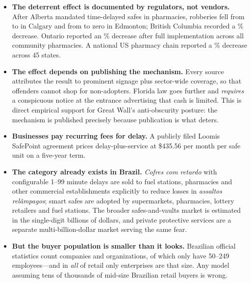 \begin{itemize}[nosep]
  \item \textbf{The deterrent effect is documented by regulators, not vendors.} After
    Alberta mandated time-delayed safes in pharmacies, robberies fell from
     to  in Calgary and from  to zero in Edmonton;
    British Columbia recorded a \% decrease\cite{ocp2024safes}. Ontario
    reported an \% decrease after full implementation across all community
    pharmacies\cite{oacp2024safes}. A national US pharmacy chain reported a
    \% decrease across 45 states\cite{cvssafes2015}.
  \item \textbf{The effect depends on publishing the mechanism.} Every source
    attributes the result to prominent signage plus sector-wide coverage, so that
    offenders cannot shop for non-adopters\cite{ocp2024safes,cvssafes2015}. Florida
    law goes further and \emph{requires} a conspicuous notice at the entrance
    advertising that cash is limited\cite{flsenate812173}. This is direct empirical
    support for Great Wall's anti-obscurity posture: the mechanism is published
    precisely because publication is what deters.
  \item \textbf{Businesses pay recurring fees for delay.} A publicly filed Loomis
    SafePoint agreement prices delay-plus-service at
    \$\num[round-precision=2]{435.56} per month per safe unit on a five-year
    term\cite{loomis2016safepoint}.
  \item \textbf{The category already exists in Brazil.} \textit{Cofres com retardo}
    with configurable 1--99 minute delays are sold to fuel stations, pharmacies and
    other commercial establishments explicitly to reduce losses in
    \textit{assaltos rel\^{a}mpagos}\cite{importec2024retardo}; smart safes are adopted
    by supermarkets, pharmacies, lottery retailers and fuel
    stations\cite{prosegur2024cofres}. The broader safes-and-vaults market is
    estimated in the single-digit billions of
    dollars\cite{grandview2024,mordor2024}, and private protective services are a
    separate multi-billion-dollar market serving the same
    fear\cite{alliedmarket2023}.
  \item \textbf{But the buyer population is smaller than it looks.} Brazilian
    official statistics count  companies and organizations, of which
    only  have 50--249 employees---and in \emph{all} of retail only
     enterprises are that size\cite{ibge2024cempre}. Any model assuming
    tens of thousands of mid-size Brazilian retail buyers is wrong.
\end{itemize}

